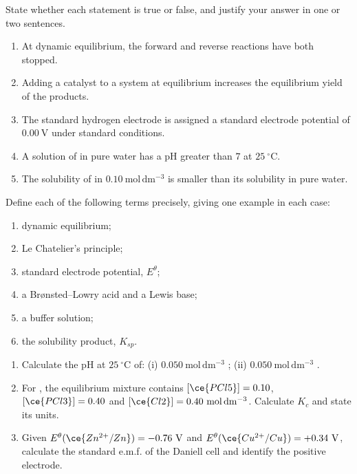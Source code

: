 \documentclass[11pt]{article}
\begin{document}
\begin{exercice}
State whether each statement is true or false, and justify your answer in one or two sentences.
\begin{enumerate}
\item At dynamic equilibrium, the forward and reverse reactions have both stopped.
\item Adding a catalyst to a system at equilibrium increases the equilibrium yield of the products.
\item The standard hydrogen electrode is assigned a standard electrode potential of $0.00\ \mathrm{V}$ under standard conditions.
\item A solution of  in pure water has a pH greater than $7$ at $25\ ^{\circ}\mathrm{C}$.
\item The solubility of  in $0.10\ \mathrm{mol\,dm^{-3}}$  is smaller than its solubility in pure water.
\end{enumerate}
\end{exercice}

\begin{exercice}[Definitions]
Define each of the following terms precisely, giving one example in each case:
\begin{enumerate}
\item dynamic equilibrium;
\item Le Chatelier's principle;
\item standard electrode potential, $E^{\theta}$;
\item a Br\o nsted--Lowry acid and a Lewis base;
\item a buffer solution;
\item the solubility product, $K_{sp}$.
\end{enumerate}
\end{exercice}

\begin{exercice}
\begin{enumerate}
\item Calculate the pH at $25\ ^{\circ}\mathrm{C}$ of: (i) $0.050\ \mathrm{mol\,dm^{-3}}$ ; (ii) $0.050\ \mathrm{mol\,dm^{-3}}$ .
\item For , the equilibrium mixture contains $[\ce{PCl5}] = 0.10$, $[\ce{PCl3}] = 0.40$ and $[\ce{Cl2}] = 0.40\ \mathrm{mol\,dm^{-3}}$. Calculate $K_c$ and state its units.
\item Given $E^{\theta}(\ce{Zn^{2+}/Zn}) = -0.76\ \mathrm{V}$ and $E^{\theta}(\ce{Cu^{2+}/Cu}) = +0.34\ \mathrm{V}$, calculate the standard e.m.f. of the Daniell cell and identify the positive electrode.
\end{enumerate}
\end{exercice}
\end{document}
